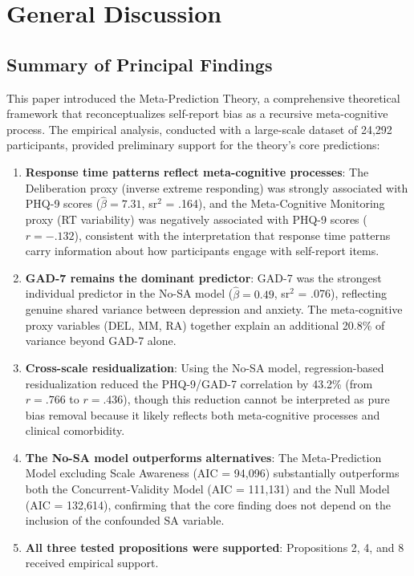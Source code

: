 \documentclass[10pt,twocolumn]{article}
\begin{document}
\section{General Discussion}

\subsection{Summary of Principal Findings}

This paper introduced the Meta-Prediction Theory, a comprehensive theoretical framework that reconceptualizes self-report bias as a recursive meta-cognitive process. The empirical analysis, conducted with a large-scale dataset of 24,292 participants, provided preliminary support for the theory's core predictions:

\begin{enumerate}
    \item \textbf{Response time patterns reflect meta-cognitive processes}: The Deliberation proxy (inverse extreme responding) was strongly associated with PHQ-9 scores ($\hat{\beta} = 7.31$, sr$^2$ = .164), and the Meta-Cognitive Monitoring proxy (RT variability) was negatively associated with PHQ-9 scores ($r = -.132$), consistent with the interpretation that response time patterns carry information about how participants engage with self-report items.
    \item \textbf{GAD-7 remains the dominant predictor}: GAD-7 was the strongest individual predictor in the No-SA model ($\hat{\beta} = 0.49$, sr$^2$ = .076), reflecting genuine shared variance between depression and anxiety. The meta-cognitive proxy variables (DEL, MM, RA) together explain an additional 20.8\% of variance beyond GAD-7 alone.
    \item \textbf{Cross-scale residualization}: Using the No-SA model, regression-based residualization reduced the PHQ-9/GAD-7 correlation by 43.2\% (from $r = .766$ to $r = .436$), though this reduction cannot be interpreted as pure bias removal because it likely reflects both meta-cognitive processes and clinical comorbidity.
    \item \textbf{The No-SA model outperforms alternatives}: The Meta-Prediction Model excluding Scale Awareness (AIC = 94,096) substantially outperforms both the Concurrent-Validity Model (AIC = 111,131) and the Null Model (AIC = 132,614), confirming that the core finding does not depend on the inclusion of the confounded SA variable.
    \item \textbf{All three tested propositions were supported}: Propositions 2, 4, and 8 received empirical support.
\end{enumerate}
\end{document}

